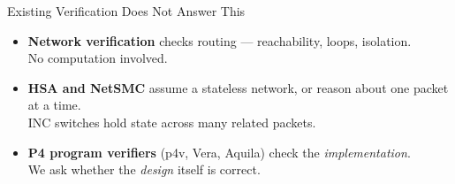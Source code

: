 \begin{frame}{Existing Verification Does Not Answer This}
  \vspace{0.8em}
  \begin{itemize}
    \item \textbf{Network verification} checks routing ---
          reachability, loops, isolation.\\
          {No computation involved.}
    \vspace{0.8em}
    \item \textbf{HSA and NetSMC} assume a stateless network,
          or reason about one packet at a time.\\
          INC switches hold state across many related packets.
    \vspace{0.8em}
    \item \textbf{P4 program verifiers} (p4v, Vera, Aquila)
          check the \emph{implementation}.\\
          We ask whether the \emph{design} itself is correct.
  \end{itemize}
\end{frame}
